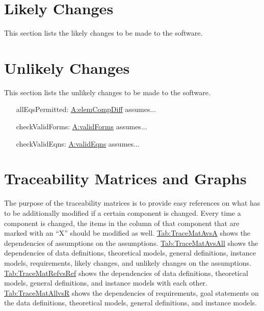 \documentclass[12pt]{article}
\begin{document}
\section{Likely Changes}
\label{Sec:LCs}
This section lists the likely changes to be made to the software.

\section{Unlikely Changes}
\label{Sec:UCs}
This section lists the unlikely changes to be made to the software.

\begin{itemize}
\item[allEqsPermitted:\phantomsection\label{allEqsPermitted}]{\hyperref[elemCompDiff]{A:elemCompDiff} assumes...}
\item[checkValidForms:\phantomsection\label{checkValidForms}]{\hyperref[validForms]{A:validForms} assumes...}
\item[checkValidEqns:\phantomsection\label{checkValidEqns}]{\hyperref[validEqns]{A:validEqns} assumes...}
\end{itemize}
\section{Traceability Matrices and Graphs}
\label{Sec:TraceMatrices}
The purpose of the traceability matrices is to provide easy references on what has to be additionally modified if a certain component is changed. Every time a component is changed, the items in the column of that component that are marked with an ``X'' should be modified as well. \hyperref[Table:TraceMatAvsA]{Tab:TraceMatAvsA} shows the dependencies of assumptions on the assumptions. \hyperref[Table:TraceMatAvsAll]{Tab:TraceMatAvsAll} shows the dependencies of data definitions, theoretical models, general definitions, instance models, requirements, likely changes, and unlikely changes on the assumptions. \hyperref[Table:TraceMatRefvsRef]{Tab:TraceMatRefvsRef} shows the dependencies of data definitions, theoretical models, general definitions, and instance models with each other. \hyperref[Table:TraceMatAllvsR]{Tab:TraceMatAllvsR} shows the dependencies of requirements, goal statements on the data definitions, theoretical models, general definitions, and instance models.
\end{document}
